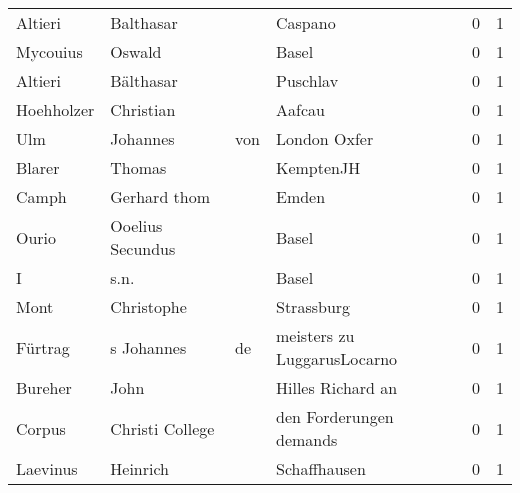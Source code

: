 \begin{tabular}{llllrr}
                  Altieri &                          Balthasar &             &                                     Caspano &          0 &         1 \\
                 Mycouius &                             Oswald &             &                                       Basel &          0 &         1 \\
                  Altieri &                          Bälthasar &             &                                    Puschlav &          0 &         1 \\
               Hoehholzer &                          Christian &             &                                      Aafcau &          0 &         1 \\
                      Ulm &                           Johannes &         von &                                London Oxfer &          0 &         1 \\
                   Blarer &                             Thomas &             &                                   KemptenJH &          0 &         1 \\
                    Camph &                       Gerhard thom &             &                                       Emden &          0 &         1 \\
                    Ourio &                   Ooelius Secundus &             &                                       Basel &          0 &         1 \\
                        I &                               s.n. &             &                                       Basel &          0 &         1 \\
                     Mont &                         Christophe &             &                                  Strassburg &          0 &         1 \\
                  Fürtrag &                         s Johannes &          de &                 meisters zu LuggarusLocarno &          0 &         1 \\
                  Bureher &                               John &             &                           Hilles Richard an &          0 &         1 \\
                   Corpus &                    Christi College &             &                     den Forderungen demands &          0 &         1 \\
                 Laevinus &                           Heinrich &             &                                Schaffhausen &          0 &         1 \\

\end{tabular}
